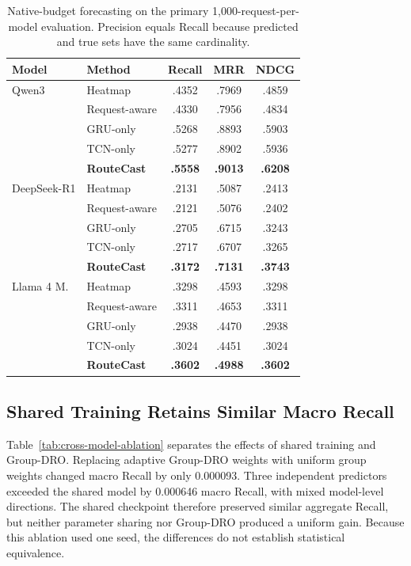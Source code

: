\documentclass[conference]{IEEEtran}
\begin{document}
\begin{table}[!t]
\centering
\caption{Native-budget forecasting on the primary 1,000-request-per-model
evaluation. Precision equals Recall because predicted and true sets have the
same cardinality.}
\label{tab:main}
\scriptsize
\setlength{\tabcolsep}{2.4pt}
\begin{tabular}{llccc}
\toprule
Model & Method & Recall & MRR & NDCG \\
\midrule
Qwen3 & Heatmap & .4352 & .7969 & .4859 \\
& Request-aware & .4330 & .7956 & .4834 \\
& GRU-only & .5268 & .8893 & .5903 \\
& TCN-only & .5277 & .8902 & .5936 \\
& \textbf{RouteCast} & \textbf{.5558} & \textbf{.9013} & \textbf{.6208} \\
\midrule
DeepSeek-R1 & Heatmap & .2131 & .5087 & .2413 \\
& Request-aware & .2121 & .5076 & .2402 \\
& GRU-only & .2705 & .6715 & .3243 \\
& TCN-only & .2717 & .6707 & .3265 \\
& \textbf{RouteCast} & \textbf{.3172} & \textbf{.7131} & \textbf{.3743} \\
\midrule
Llama 4 M. & Heatmap & .3298 & .4593 & .3298 \\
& Request-aware & .3311 & .4653 & .3311 \\
& GRU-only & .2938 & .4470 & .2938 \\
& TCN-only & .3024 & .4451 & .3024 \\
& \textbf{RouteCast} & \textbf{.3602} & \textbf{.4988} & \textbf{.3602} \\
\bottomrule
\end{tabular}
\end{table}

\subsection{Shared Training Retains Similar Macro Recall}

Table~\ref{tab:cross-model-ablation} separates the effects of shared training
and Group-DRO. Replacing adaptive Group-DRO weights with uniform group weights
changed macro Recall by only 0.000093. Three independent predictors exceeded
the shared model by 0.000646 macro Recall, with mixed model-level directions.
The shared checkpoint therefore preserved similar aggregate Recall, but
neither parameter sharing nor Group-DRO produced a uniform gain. Because this
ablation used one seed, the differences do not establish statistical
equivalence.
\end{document}
